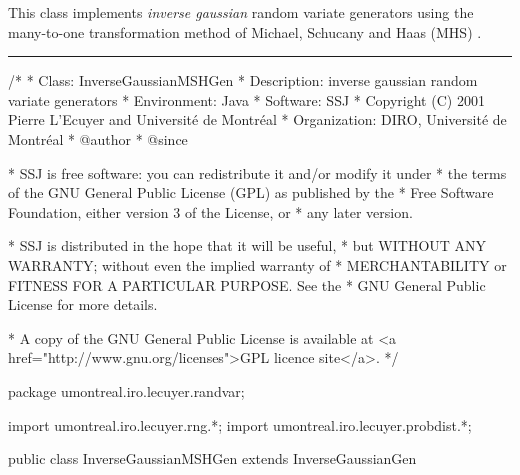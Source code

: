 
This class implements \emph{inverse gaussian} random variate generators using
the many-to-one transformation method of Michael, Schucany and Haas (MHS)
 \cite{rMIC76a,rDEV06a}.

\bigskip\hrule

\begin{code}
\begin{hide}
/*
 * Class:        InverseGaussianMSHGen
 * Description:  inverse gaussian random variate generators
 * Environment:  Java
 * Software:     SSJ 
 * Copyright (C) 2001  Pierre L'Ecuyer and Université de Montréal
 * Organization: DIRO, Université de Montréal
 * @author       
 * @since

 * SSJ is free software: you can redistribute it and/or modify it under
 * the terms of the GNU General Public License (GPL) as published by the
 * Free Software Foundation, either version 3 of the License, or
 * any later version.

 * SSJ is distributed in the hope that it will be useful,
 * but WITHOUT ANY WARRANTY; without even the implied warranty of
 * MERCHANTABILITY or FITNESS FOR A PARTICULAR PURPOSE.  See the
 * GNU General Public License for more details.

 * A copy of the GNU General Public License is available at
   <a href="http://www.gnu.org/licenses">GPL licence site</a>.
 */
\end{hide}
package umontreal.iro.lecuyer.randvar;\begin{hide}
import umontreal.iro.lecuyer.rng.*;
import umontreal.iro.lecuyer.probdist.*;
\end{hide}

public class InverseGaussianMSHGen extends InverseGaussianGen \begin{hide} {
   private NormalGen genN;
\end{hide}\end{code}

